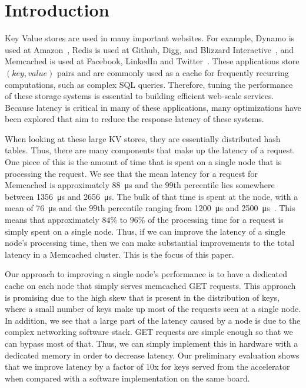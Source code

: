 \section{Introduction}
Key Value stores are used in many important websites. For example, 
Dynamo is used at Amazon~\cite{dynamo}, Redis is used at Github, Digg, and Blizzard
Interactive~\cite{Reddi10}, and Memcached is used at Facebook, LinkedIn and
Twitter~\cite{memcached, Petrovic08}. These applications store $(key, value)$ 
pairs and are commonly used as a cache for frequently recurring computations, 
such as complex SQL queries. Therefore, tuning the performance of these 
storage systems is essential to building efficient web-scale services.
Because latency is critical in many of these applications, many optimizations 
have been explored that aim to reduce the response latency of these systems. 

When looking at these large KV stores, they are essentially distributed hash
tables. Thus, there are many components that make up the latency of a request.
One piece of this is the amount of time that is spent on a single node that is
processing the request. We see that the mean latency for a request for
Memcached is approximately \SI{88}{\micro\s} and the $99$th percentile lies
somewhere between \SI{1356}{\micro\s} and \SI{2656}{\micro\s}.  The bulk
of that time is spent at the node, with a mean of \SI{76}{\micro\s} and
the $99$th percentile ranging from \SI{1200}{\micro\s} and
\SI{2500}{\micro\s}~\cite{Kapoor2012}.  This means that approximately
$84\%$ to $96\%$ of the processing time for a request is simply spent on a
single node. Thus, if we can improve the latency of a single node's processing
time, then we can make substantial improvements to the total latency in a
Memcached cluster. This is the focus of this paper.

Our approach to improving a single node's performance is to have a dedicated
cache on each node that simply serves memcached GET requests. This approach is
promising due to the high skew that is present in the distribution of keys,
where a small number of keys make up most of the requests seen at a single
node. In addition, we see that a large part of the latency caused by a node is
due to the complex networking software stack. GET requests are simple enough so
that we can bypass most of that. Thus, we can simply implement this in hardware
with a dedicated memory in order to decrease latency. Our preliminary
evaluation shows that we improve latency by a factor of 10x for keys served
from the accelerator when compared with a software implementation on the same
board.
